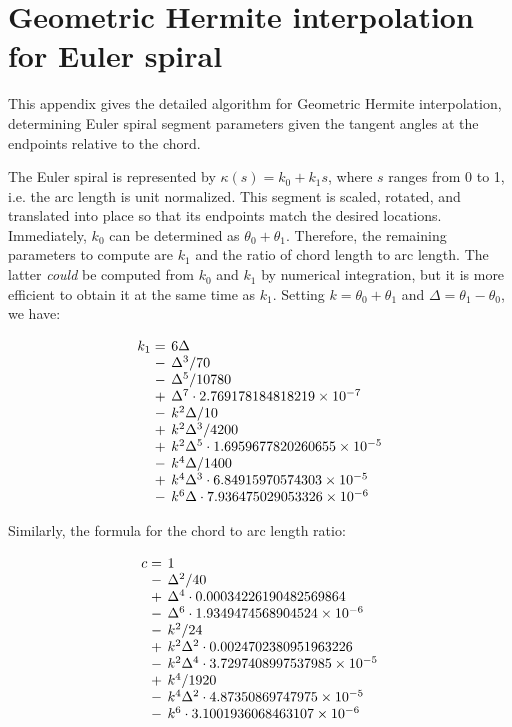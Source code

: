 \documentclass[sigconf, authordraft]{acmart}
\begin{document}
\appendix

\section{Geometric Hermite interpolation for Euler spiral}
\label{appendix:gh}

This appendix gives the detailed algorithm for Geometric Hermite interpolation, determining Euler spiral segment parameters given the tangent angles at the endpoints relative to the chord.

The Euler spiral is represented by $\kappa(s) = k_0 + k_1s$, where $s$ ranges from 0 to 1, i.e. the arc length is unit normalized. This segment is scaled, rotated, and translated into place so that its endpoints match the desired locations. Immediately, $k_0$ can be determined as $\theta_0 + \theta_1$. Therefore, the remaining parameters to compute are $k_1$ and the ratio of chord length to arc length. The latter \emph{could} be computed from $k_0$ and $k_1$ by numerical integration, but it is more efficient to obtain it at the same time as $k_1$. Setting $k = \theta_0 + \theta_1$ and $\Delta = \theta_1 - \theta_0$, we have:

\[
    \setlength\arraycolsep{2pt}
    \begin{array}{rl}
    k_1 = & 6\Delta \\
     - & \Delta^3 / 70 \\
     - & \Delta^5 / 10780 \\
     + & \Delta^7 \cdot 2.769178184818219\times 10^{-7} \\
     - & k^2\Delta / 10 \\
     + & k^2\Delta^3 / 4200 \\
     + & k^2\Delta^5 \cdot 1.6959677820260655\times 10^{-5} \\
     - & k^4\Delta / 1400 \\
     + & k^4\Delta^3 \cdot 6.84915970574303\times 10^{-5} \\
     - & k^6\Delta \cdot 7.936475029053326\times 10^{-6}
    \end{array}
\]

Similarly, the formula for the chord to arc length ratio:

\[
    \setlength\arraycolsep{2pt}
    \begin{array}{rl}
    c = & 1 \\
    - & \Delta^2 / 40 \\
    + & \Delta^4 \cdot 0.00034226190482569864 \\
    - & \Delta^6 \cdot 1.9349474568904524\times 10^{-6} \\
    - & k^2 / 24 \\
    + & k^2\Delta^2 \cdot 0.0024702380951963226 \\
    - & k^2\Delta^4 \cdot 3.7297408997537985\times 10^{-5} \\
    + & k^4 / 1920 \\
    - & k^4\Delta^2 \cdot 4.87350869747975\times 10^{-5} \\
    - & k^6 \cdot 3.1001936068463107\times 10^{-6}
    \end{array}
\]
\end{document}
